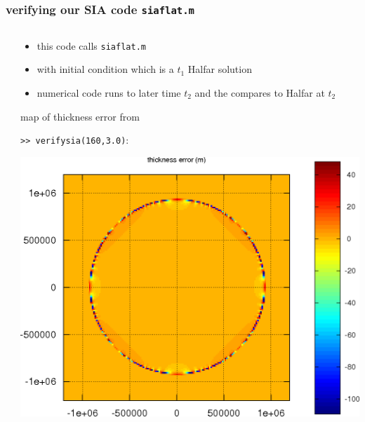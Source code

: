 \begin{frame}[fragile]
\frametitle{verifying our SIA code \texttt{siaflat.m}}

\begin{columns}
\begin{column}{0.6\textwidth}
\end{column}

\begin{column}{0.4\textwidth}
\small
\begin{itemize}
\item this code calls \texttt{siaflat.m}
\item with initial condition which is a $t_1$ Halfar solution
\item numerical code runs to later time $t_2$ and the compares to Halfar at $t_2$
\end{itemize}

\bigskip
\scriptsize
map of thickness error from

\qquad \texttt{>> verifysia(160,3.0)}:

\includegraphics[width=1.0\textwidth]{photos/siaerror}
\end{column}
\end{columns}
\end{frame}


